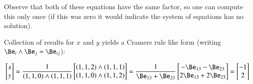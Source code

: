 \documentclass{article}      %
\begin{document}
Observe that both of these equations have the same factor, so
one can compute this only once (if this was zero it would
indicate the system of equations has no solution).

Collection of results for
$x$ and $y$ yields a Cramers rule like form
(writing $\Be _i \wedge \Be _j = \Be _{ij}$):

\[
\begin{bmatrix}
x \\ y\end
{bmatrix}
=
\frac{1}{(1, 1, 0) \wedge (1, 1, 1)}
\begin{bmatrix}
(1, 1, 2) \wedge (1, 1, 1) \\
(1, 1, 0) \wedge (1, 1, 2)
\end{bmatrix}
=
\frac{1}{\Be_{13} + \Be_{23}}
\begin{bmatrix}
{-\Be_{13} - \Be_{23}} \\
{2\Be_{13} +2\Be_{23}} \\
\end{bmatrix}
=
\begin{bmatrix}
-1 \\ 2
\end{bmatrix}
\]



\end{document}
